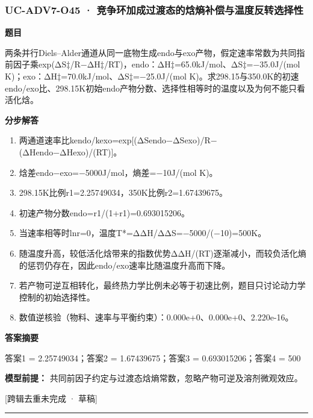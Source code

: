 \documentclass[UTF8,11pt,a4paper]{ctexart}
\begin{document}
\subsubsection*{UC-ADV7-O45 · 竞争环加成过渡态的焓熵补偿与温度反转选择性}
\noindent\textbf{题目}\par
两条并行Diels–Alder通道从同一底物生成endo与exo产物，假定速率常数为共同指前因子乘exp(ΔS‡/R−ΔH‡/RT)，endo：ΔH‡=65.0kJ/mol、ΔS‡=−35.0J/(mol K)；exo：ΔH‡=70.0kJ/mol、ΔS‡=−25.0J/(mol K)。求298.15与350.0K的初速endo/exo比、298.15K初始endo产物分数、选择性相等时的温度以及为何不能只看活化焓。\par
\medskip\noindent\textbf{分步解答}
\begin{enumerate}
\item 两通道速率比kendo/kexo=exp[(ΔSendo−ΔSexo)/R−(ΔHendo−ΔHexo)/(RT)]。
\item 焓差endo−exo=−5000J/mol，熵差=−10J/(mol K)。
\item 298.15K比例r1=2.25749034，350K比例r2=1.67439675。
\item 初速产物分数endo=r1/(1+r1)=0.693015206。
\item 当速率相等时lnr=0，温度T*=ΔΔH/ΔΔS=−5000/(−10)=500K。
\item 随温度升高，较低活化焓带来的指数优势ΔΔH/(RT)逐渐减小，而较负活化熵的惩罚仍存在，因此endo/exo速率比随温度升高而下降。
\item 若产物可逆互相转化，最终热力学比例未必等于初速比例，题目只讨论动力学控制的初始选择性。
\item 数值逆核验（物料、速率与平衡约束）：0.000e+0、0.000e+0、2.220e-16。
\end{enumerate}
\noindent\textbf{答案摘要}\par
答案1 = 2.25749034；答案2 = 1.67439675；答案3 = 0.693015206；答案4 = 500\par
\noindent\textbf{模型前提：}
共同前因子约定与过渡态焓熵常数，忽略产物可逆及溶剂微观效应。\par
\noindent\textcolor{red!65!black}{[跨辑去重未完成 · 草稿]} \par
\medskip\hrule\medskip
{}
\end{document}
